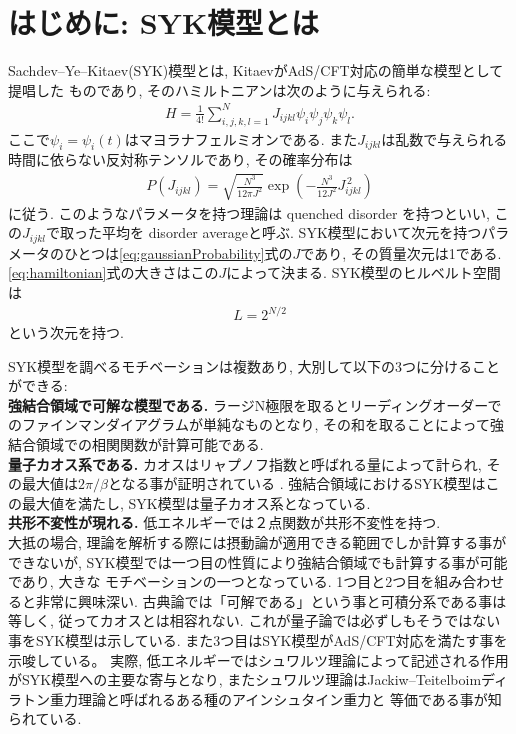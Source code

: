 \section{はじめに: SYK模型とは}
Sachdev--Ye--Kitaev(SYK)模型とは, KitaevがAdS/CFT対応の簡単な模型として提唱した
ものであり, そのハミルトニアンは次のように与えられる:
\begin{align}
  H = \frac{1}{4!}\sum_{i,j,k,l = 1}^{N} J_{ijkl}\psi_i\psi_j\psi_k\psi_l.
  \label{eq:hamiltonian}
\end{align}
ここで$\psi_i = \psi_i(t)$はマヨラナフェルミオンである. 
また$J_{ijkl}$は乱数で与えられる時間に依らない反対称テンソルであり, その確率分布は
\begin{align}
  P(J_{ijkl}) = \sqrt{\frac{N^3}{12\pi J^2}}
                \exp\left(-\frac{N^3}{12J^2}J_{ijkl}^{\, 2}\right)
	\label{eq:gaussianProbability}
\end{align}
に従う. 
このようなパラメータを持つ理論は quenched disorder を持つといい, 
この$J_{ijkl}$で取った平均を disorder averageと呼ぶ. 
SYK模型において次元を持つパラメータのひとつは\eqref{eq:gaussianProbability}式の$J$であり, 
その質量次元は1である. \eqref{eq:hamiltonian}式の大きさはこの$J$によって決まる. 
SYK模型のヒルベルト空間は
\begin{align}
	L = 2^{N/2}
\end{align}
という次元を持つ. 

SYK模型を調べるモチベーションは複数あり, 大別して以下の3つに分けることができる:\\

\textbf{強結合領域で可解な模型である.}
ラージN極限を取るとリーディングオーダーでのファインマンダイアグラムが単純なものとなり, 
その和を取ることによって強結合領域での相関関数が計算可能である. \\

\textbf{量子カオス系である.}
カオスはリャプノフ指数と呼ばれる量によって計られ, 
その最大値は$2\pi / \beta$となる事が証明されている \cite{shenker}. 
強結合領域におけるSYK模型はこの最大値を満たし\cite{maldacena}, 
SYK模型は量子カオス系となっている. \\

\textbf{共形不変性が現れる.}
低エネルギーでは２点関数が共形不変性を持つ. \\

大抵の場合, 理論を解析する際には摂動論が適用できる範囲でしか計算する事ができないが, 
SYK模型では一つ目の性質により強結合領域でも計算する事が可能であり, 大きな
モチベーションの一つとなっている. 
1つ目と2つ目を組み合わせると非常に興味深い. 
古典論では「可解である」という事と可積分系である事は等しく, 従ってカオスとは相容れない\cite{polchinski}. 
これが量子論では必ずしもそうではない事をSYK模型は示している. 
また3つ目はSYK模型がAdS/CFT対応を満たす事を示唆している。
実際, 低エネルギーではシュワルツ理論によって記述される作用がSYK模型への主要な寄与となり, 
またシュワルツ理論はJackiw--Teitelboimディラトン重力理論と呼ばれるある種のアインシュタイン重力と
等価である事が知られている.


